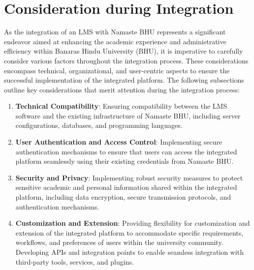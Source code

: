 \section{Consideration during Integration}
As the integration of an LMS with Namaste BHU represents a significant endeavor aimed at enhancing the academic experience and administrative efficiency within Banaras Hindu University (BHU), it is imperative to carefully consider various factors throughout the integration process. These considerations encompass technical, organizational, and user-centric aspects to ensure the successful implementation of the integrated platform. The following subsections outline key considerations that merit attention during the integration process:

\begin{enumerate}
	\item \textbf{Technical Compatibility}: Ensuring compatibility between the LMS software and the existing infrastructure of Namaste BHU, including server configurations, databases, and programming languages.
	\item \textbf{User Authentication and Access Control}: Implementing secure authentication mechanisms to ensure that users can access the integrated platform seamlessly using their existing credentials from Namaste BHU.
    \item \textbf{Security and Privacy}: Implementing robust security measures to protect sensitive academic and personal information shared within the integrated platform, including data encryption, secure transmission protocols, and authentication mechanisms.
    \item \textbf{Customization and Extension}: Providing flexibility for customization and extension of the integrated platform to accommodate specific requirements, workflows, and preferences of users within the university community. Developing APIs and integration points to enable seamless integration with third-party tools, services, and plugins.
	      	
\end{enumerate}

